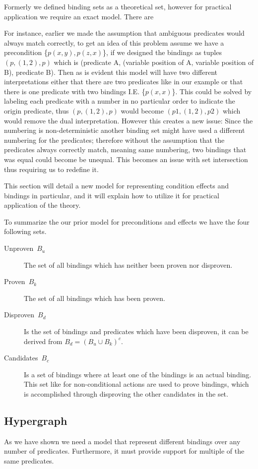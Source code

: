 \documentclass[../Master.tex]{subfiles}
\begin{document}
Formerly we defined binding sets as a theoretical set, however for practical application we require an exact model.
There are


For instance, earlier we made the assumption that ambiguous predicates would always match correctly, to get an idea of this problem
assume we have a precondition \{$p(x,y), p(z,x)$\}, if we designed the bindings as tuples $(p,(1,2),p)$ which is (predicate A, (variable position of A, variable position of B), predicate B).
Then as is evident this model will have two different interpretations either that there are two predicates like in our example or that there is one predicate with two bindings I.E. \{$p(x,x)$\}.
This could be solved by labeling each predicate with a number in no particular order  to indicate the origin predicate, thus $(p,(1,2),p)$ would become  $(p1,(1,2),p2)$ which would remove the dual interpretation.
However this creates a new issue: Since the numbering is non-deterministic another binding set might have used a different numbering for the predicates;
therefore without the assumption that the predicates always correctly match, meaning same numbering, two bindings that was equal could become be unequal. This becomes an issue with set intersection thus requiring us to redefine it.


This section will detail a new model for representing condition effects and bindings in particular, and it will explain how to utilize it for practical application of the theory.

To summarize the our prior model for preconditions and effects we have the four following sets.
\begin{description}
	\item [{Unproven~$B_u$}] The set of all bindings which has
	neither been proven nor disproven.
	\item [{Proven~$B_k$}] The set of all bindings which has been
	proven.
	\item [{Disproven~$B_d$}] Is the set of bindings and predicates which have
	been disproven, it can be derived from $B_d=\left(B_u\cup B_k\right)^{c}$.
	\item [{Candidates~$B_c$}] Is a set of bindings where at least one of the bindings is an actual binding.
	This set like for non-conditional actions are used to prove bindings,
	which is accomplished through disproving the other candidates in the set.
\end{description}


	\subsection*{Hypergraph}
	As we have shown we need a model that represent different bindings over any number of predicates.
	Furthermore, it must provide support for multiple of the same predicates.
\end{document}
